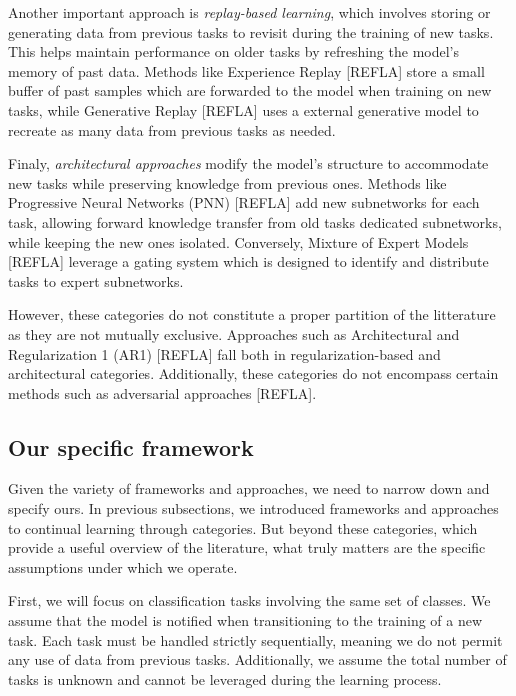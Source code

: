 \documentclass[twocolumn]{article}
\begin{document}
\vspace{2mm}
\noindent
Another important approach is \textit{replay-based learning}, which involves storing or generating data from previous tasks to revisit during the training of new tasks. This helps maintain performance on older tasks by refreshing the model's memory of past data. Methods like Experience Replay [REFLA] store a small buffer of past samples which are forwarded to the model when training on new tasks, while Generative Replay [REFLA] uses a external generative model to recreate as many data from previous tasks as needed. 

\vspace{2mm}
\noindent
Finaly, \textit{architectural approaches} modify the model's structure to accommodate new tasks while preserving knowledge from previous ones. Methods like Progressive Neural Networks (PNN) [REFLA] add new subnetworks for each task, allowing forward knowledge transfer from old tasks dedicated subnetworks, while keeping the new ones isolated. Conversely, Mixture of Expert Models [REFLA] leverage a gating system which is designed to identify and distribute tasks to expert subnetworks.

\vspace{2mm}
\noindent
However, these categories do not constitute a proper partition of the litterature as they are not mutually exclusive. Approaches such as Architectural and Regularization 1 (AR1) [REFLA] fall both in regularization-based and architectural categories. Additionally, these categories do not encompass certain methods such as adversarial approaches [REFLA].


\subsection{Our specific framework}


Given the variety of frameworks and approaches, we need to narrow down and specify ours. In previous subsections, we introduced frameworks and approaches to continual learning through categories. But beyond these categories, which provide a useful overview of the literature, what truly matters are the specific assumptions under which we operate.

\vspace{2mm}
\noindent
First, we will focus on classification tasks involving the same set of classes. We assume that the model is notified when transitioning to the training of a new task. Each task must be handled strictly sequentially, meaning we do not permit any use of data from previous tasks. Additionally, we assume the total number of tasks is unknown and cannot be leveraged during the learning process.
\end{document}
